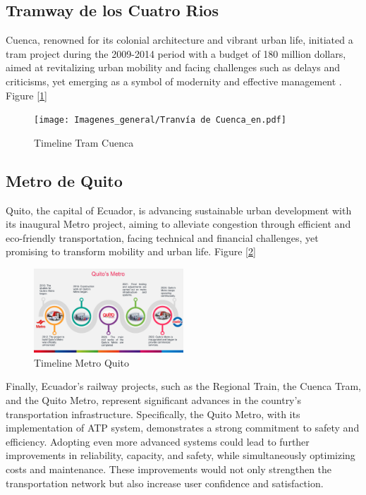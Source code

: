 \documentclass[conference]{IEEEtran}
\begin{document}
\subsection{Tramway de los Cuatro Rios}

Cuenca, renowned for its colonial architecture and vibrant urban life, initiated a tram project during the 2009-2014 period with a budget of 180 million dollars, aimed at revitalizing urban mobility and facing challenges such as delays and criticisms, yet emerging as a symbol of modernity and effective management \cite{b3}. Figure [\ref{fig:timeline_train_cu}]

\begin{figure}[htbp]
    \centering
    \texttt{[image: Imagenes\_general/Tranvía de Cuenca\_en.pdf]}
    \caption{Timeline Tram Cuenca}
    \label{fig:timeline_train_cu}
\end{figure}

\subsection{Metro de Quito}

Quito, the capital of Ecuador, is advancing sustainable urban development with its inaugural Metro project, aiming to alleviate congestion through efficient and eco-friendly transportation, facing technical and financial challenges, yet promising to transform mobility and urban life. Figure [\ref{Timeline Metro Quito}]

\begin{figure}[htbp]                                     
    \centerline{\includegraphics[width=0.5\textwidth, scale=0.50]{Imagenes_general/Metro de Quito_en.pdf}}
    \caption{Timeline Metro Quito}                     
    \label{Timeline Metro Quito}                                                 
\end{figure} 

Finally, Ecuador's railway projects, such as the Regional Train, the Cuenca Tram, and the Quito Metro, represent significant advances in the country's transportation infrastructure. Specifically, the Quito Metro, with its implementation of ATP system, demonstrates a strong commitment to safety and efficiency. Adopting even more advanced systems could lead to further improvements in reliability, capacity, and safety, while simultaneously optimizing costs and maintenance. These improvements would not only strengthen the transportation network but also increase user confidence and satisfaction.
\end{document}
